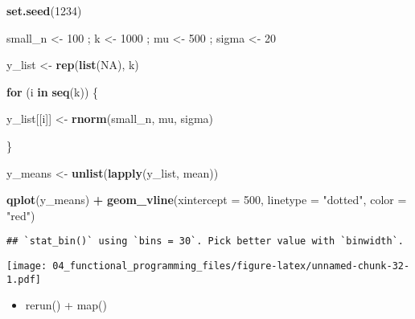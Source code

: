 \documentclass[
]{book}
\newenvironment{Shaded}{\begin{snugshade}}{\end{snugshade}}
\newcommand{\ControlFlowTok}[1]{\textcolor[rgb]{0.13,0.29,0.53}{\textbf{#1}}}
\newcommand{\DataTypeTok}[1]{\textcolor[rgb]{0.13,0.29,0.53}{#1}}
\newcommand{\DecValTok}[1]{\textcolor[rgb]{0.00,0.00,0.81}{#1}}
\newcommand{\KeywordTok}[1]{\textcolor[rgb]{0.13,0.29,0.53}{\textbf{#1}}}
\newcommand{\NormalTok}[1]{#1}
\newcommand{\OperatorTok}[1]{\textcolor[rgb]{0.81,0.36,0.00}{\textbf{#1}}}
\newcommand{\OtherTok}[1]{\textcolor[rgb]{0.56,0.35,0.01}{#1}}
\newcommand{\StringTok}[1]{\textcolor[rgb]{0.31,0.60,0.02}{#1}}
\providecommand{\tightlist}{%
  \setlength{\itemsep}{0pt}\setlength{\parskip}{0pt}}
\begin{document}
\begin{Shaded}
\begin{Highlighting}[]
\KeywordTok{set.seed}\NormalTok{(}\DecValTok{1234}\NormalTok{)}

\NormalTok{small\_n \textless{}{-}}\StringTok{ }\DecValTok{100}\NormalTok{ ; k \textless{}{-}}\StringTok{ }\DecValTok{1000}\NormalTok{ ; mu \textless{}{-}}\StringTok{ }\DecValTok{500}\NormalTok{ ; sigma \textless{}{-}}\StringTok{ }\DecValTok{20} 

\NormalTok{y\_list \textless{}{-}}\StringTok{ }\KeywordTok{rep}\NormalTok{(}\KeywordTok{list}\NormalTok{(}\OtherTok{NA}\NormalTok{), k)}

\ControlFlowTok{for}\NormalTok{ (i }\ControlFlowTok{in} \KeywordTok{seq}\NormalTok{(k)) \{}
        
\NormalTok{    y\_list[[i]] \textless{}{-}}\StringTok{ }\KeywordTok{rnorm}\NormalTok{(small\_n, mu, sigma)}
        
\NormalTok{\}}

\NormalTok{y\_means \textless{}{-}}\StringTok{ }\KeywordTok{unlist}\NormalTok{(}\KeywordTok{lapply}\NormalTok{(y\_list, mean))}

\KeywordTok{qplot}\NormalTok{(y\_means) }\OperatorTok{+}
\StringTok{   }\KeywordTok{geom\_vline}\NormalTok{(}\DataTypeTok{xintercept =} \DecValTok{500}\NormalTok{, }\DataTypeTok{linetype =} \StringTok{"dotted"}\NormalTok{, }\DataTypeTok{color =} \StringTok{"red"}\NormalTok{)}
\end{Highlighting}
\end{Shaded}

\begin{verbatim}
## `stat_bin()` using `bins = 30`. Pick better value with `binwidth`.
\end{verbatim}

\texttt{[image: 04\_functional\_programming\_files/figure-latex/unnamed-chunk-32-1.pdf]}

\begin{itemize}
\tightlist
\item
  rerun() + map()
\end{itemize}
\end{document}
